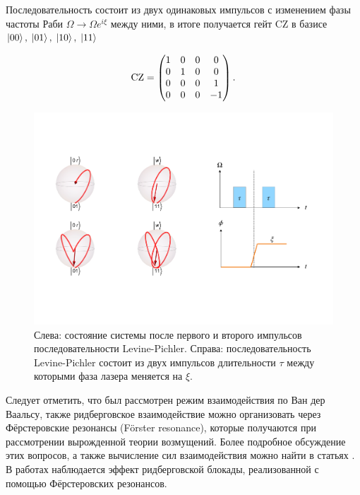 Последовательность состоит из двух одинаковых импульсов с изменением фазы частоты Раби $\Omega \rightarrow \Omega e^{i\xi}$ между ними, в итоге получается гейт CZ в базисе $\left| 00 \right\rangle, \; \left| 01 \right\rangle, \; \left| 10 \right\rangle, \; \left| 11 \right\rangle$ 

\begin{equation}
	\rm{CZ} = \begin{pmatrix}
		1 & 0 & 0 & 0\\
		0 & 1 & 0 & 0\\
		0 & 0 & 0 & 1\\
		0 & 0 & 0 & -1
	\end{pmatrix}.
\end{equation}

\begin{figure}[ht]
	\centering
	\includegraphics[width=1.0\textwidth]{images/LP_total.pdf}
	\caption{Слева: состояние системы после первого и второго импульсов последовательности Levine-Pichler. Справа: последовательность Levine-Pichler состоит из двух импульсов длительности $\tau$ между которыми фаза лазера меняется на $\xi$.}
	\label{fig:LP_total}
\end{figure}


Следует отметить, что был рассмотрен режим взаимодействия по Ван дер Ваальсу, также ридберговское взаимодействие можно организовать через Фёрстеровские резонансы (Förster resonance), которые получаются при рассмотрении вырожденной теории возмущений. Более подробное обсуждение этих вопросов, а также вычисление сил взаимодействия можно найти в статьях \cite{Saffman_Rydberg1, Saffman_Rydberg2,PhysRevLett.85.2208}. В работах \cite{Chew:2022aa,Urban:2009aa} наблюдается эффект ридберговской блокады, реализованной с помощью Фёрстеровских резонансов. 

